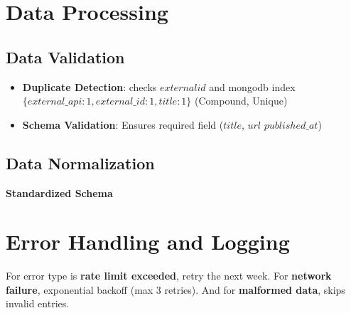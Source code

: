 \section{Data Processing}\label{sec:data-processing}


\subsection{Data Validation}\label{subsec:data-validation}

\begin{itemize}
    \item \textbf{Duplicate Detection}: checks $external id$ and mongodb index $\{ external\_api: 1, external\_id: 1, title: 1 \}$ (Compound, Unique)
    \item \textbf{Schema Validation}: Ensures required field ($title$, $url$ $published\_at$)
\end{itemize}

\subsection{Data Normalization}\label{subsec:data-normalization}

\textbf{Standardized Schema}


\section{Error Handling and Logging}\label{sec:error-handling-and-logging}


For error type is \textbf{rate limit exceeded}, retry the next week.
For \textbf{network failure}, exponential backoff (max 3 retries).
And for \textbf{malformed data}, skips invalid entries.



